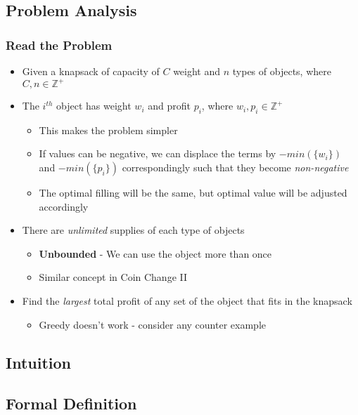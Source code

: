 \documentclass{beamer}
\begin{document}
\subsection{Problem Analysis}
\begin{frame}
	\frametitle{Read the Problem}
	\begin{itemize}
		\item Given a knapsack of capacity of \( C \) weight and \( n \) types of objects, where
	\(
		C, n \in \mathbb{Z}^+
	\)
	\item The \( i^{th} \) object has weight \( w_i \) and profit \( p_i \), where 
		\(
			w_i, p_i \in \mathbb{Z}^+
		\)
		\begin{itemize}
			\item This makes the problem simpler 
			\item If values can be negative, we can displace the terms by \( - min(\{w_i\}) \) and \( - min(\{p_i\}) \) correspondingly such that they become \emph{non-negative} 
			\item The optimal filling will be the same, but optimal value will be adjusted accordingly
		\end{itemize}	
	\item There are \emph{unlimited} supplies of each type of objects
		\begin{itemize}
			\item \textbf{Unbounded} - We can use the object more than once
			\item Similar concept in Coin Change II 
		\end{itemize}	
	\item Find the \emph{largest} total profit of any set of the object that fits in the knapsack
		\begin{itemize}
			\item Greedy doesn't work - consider any counter example
		\end{itemize}
	\end{itemize}
\end{frame}

\subsection{Intuition}
\begin{frame}
	
\end{frame}

\subsection{Formal Definition}
\begin{frame}
	
\end{frame}
\end{document}
